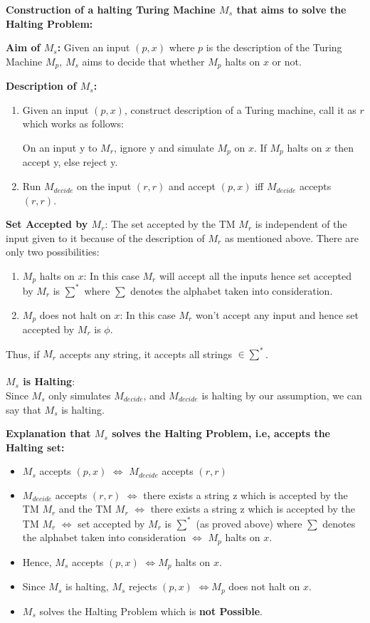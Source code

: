 \documentclass[12pt,a4paper]{article}
\begin{document}
\textbf{Construction of a halting Turing Machine $M_s$ that aims to solve the Halting Problem:}

\textbf{Aim of $M_s$:} Given an input $(p,x)$ where $p$ is the description of the Turing Machine $M_p$, $M_s$ aims to decide that whether $M_p$ halts on $x$ or not.

\textbf{Description of $M_s$:} 
\begin{enumerate}
    \item Given an input $(p,x)$, construct description of a Turing machine, call it as $r$ which works as follows: 
    
    On an input y to $M_r$, ignore y and simulate $M_p$ on $x$. If $M_p$ halts on $x$ then accept y, else reject y.
    \item Run $M_{decide}$ on the input $(r,r)$ and accept $(p,x)$ iff $M_{decide}$ accepts $(r,r)$.
\end{enumerate}

\textbf{Set Accepted by $M_r$}:
The set accepted by the TM $M_r$ is independent of the input given to it because of the description of $M_r$ as mentioned above. There are only two possibilities:

\begin{enumerate}
    \item $M_p$ halts on $x$: In this case $M_r$ will accept all the inputs hence set accepted by $M_r$ is $\sum^*$ where $\sum$ denotes the alphabet taken into consideration.
    \item $M_p$ does not halt on $x$: In this case $M_r$ won't accept any input and hence set accepted by $M_r$ is $\phi$.
\end{enumerate}
Thus, if $M_r$ accepts any string, it accepts all strings $\in \sum^*$.\\
\\
\textbf{$M_s$ is Halting}:
\\Since $M_{s}$ only simulates $M_{decide}$, and $M_{decide}$ is halting by our assumption, we can say that $M_{s}$ is halting.

\textbf{Explanation that $M_s$ solves the Halting Problem, i.e, accepts the Halting set:}

\begin{itemize}
    \item $M_s$ accepts $(p,x)$ $\iff$ $M_{decide}$ accepts $(r,r)$
    \item $M_{decide}$ accepts $(r,r)$ $\iff$ there exists a string z which is accepted by the TM $M_r$ and the TM $M_r$ $\iff$ there exists a string z which is accepted by the TM  $M_r$ $\iff$ set accepted by $M_r$ is $\sum^*$ (as proved above) where $\sum$ denotes the alphabet taken into consideration $\iff$ $M_p$ halts on $x$.
    \item Hence, $M_s$ accepts $(p,x)$ $\iff M_p$ halts on $x$.
    \item Since $M_s$ is halting, $M_s$ rejects $(p,x)$ $\iff M_p$ does not halt on $x$.
    \item $M_s$ solves the Halting Problem which is \textbf{not Possible}.
\end{itemize}
\end{document}
